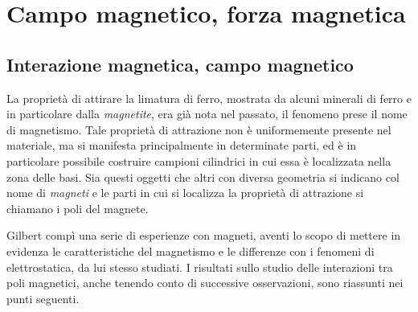 \documentclass[class=book, crop=false, oneside, 12pt]{standalone}
\begin{document}
\chapter{Campo magnetico, forza magnetica}

\section{Interazione magnetica, campo magnetico}

La proprietà di attirare la limatura di ferro, mostrata da alcuni minerali di ferro e in particolare dalla \emph{magnetite}, era già nota nel passato, il fenomeno prese il nome di magnetismo.
Tale proprietà di attrazione non è uniformemente presente nel materiale, ma si manifesta principalmente in determinate parti, ed è in particolare possibile costruire campioni cilindrici in cui essa è localizzata nella zona delle basi. 
Sia questi oggetti che altri con diversa geometria si indicano col nome di \emph{magneti} e le parti in cui si localizza la proprietà di attrazione si chiamano i poli del magnete.

Gilbert compì una serie di esperienze con magneti, aventi lo scopo di mettere in evidenza le caratteristiche del magnetismo e le differenze con i fenomeni di elettrostatica, da lui stesso studiati. 
I risultati sullo studio delle interazioni tra poli magnetici, anche tenendo conto di successive osservazioni, sono riassunti nei punti seguenti.
\end{document}
